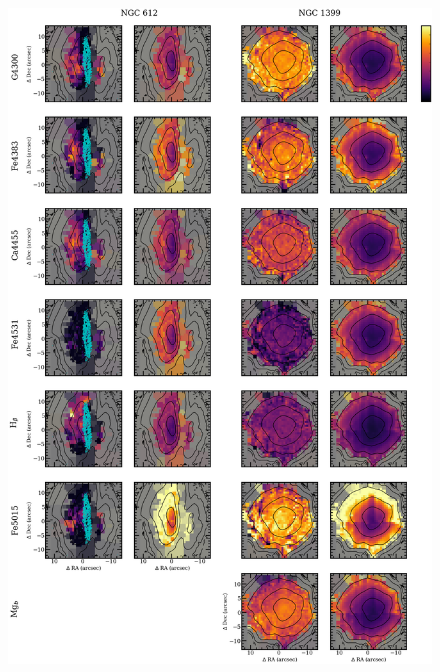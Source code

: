 {{\begin{figure}
			\includegraphics[height=0.94\textheight]{chapter4/vimos/abs3.png}
		\end{figure}
		\begin{figure}
			\centering

\end{figure}}}
